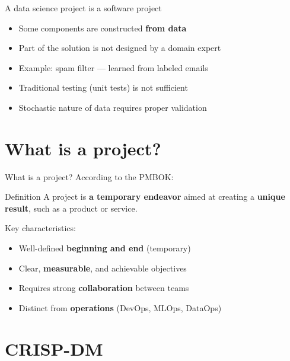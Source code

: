 \begin{frame}{A data science project is a software project}
  \begin{itemize}
    \item Some components are constructed \textbf{from data}
    \item Part of the solution is not designed by a domain expert
    \item Example: spam filter --- learned from labeled emails
    \item Traditional testing (unit tests) is not sufficient
    \item Stochastic nature of data requires proper validation
  \end{itemize}
\end{frame}

\section{What is a project?}

\begin{frame}{What is a project?}
  According to the PMBOK:

  \vspace{0.3cm}
  \begin{block}{Definition}
    A project is \textbf{a temporary endeavor} aimed at creating a \textbf{unique result},
    such as a product or service.
  \end{block}

  \vspace{0.3cm}
  Key characteristics:
  \begin{itemize}
    \item Well-defined \textbf{beginning and end} (temporary)
    \item Clear, \textbf{measurable}, and achievable objectives
    \item Requires strong \textbf{collaboration} between teams
    \item Distinct from \textbf{operations} (DevOps, MLOps, DataOps)
  \end{itemize}
\end{frame}

\section{CRISP-DM}

